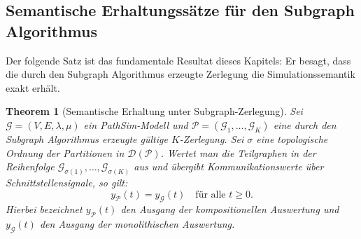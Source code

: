 ﻿\documentclass[12pt,a4paper]{article}
\newtheorem{theorem}{Theorem}[section]
\theoremstyle{definition}
\begin{document}
\subsection{Semantische Erhaltungssätze für den Subgraph Algorithmus}
\label{subsec:subgraph-sem}

Der folgende Satz ist das fundamentale Resultat dieses Kapitels:
Er besagt, dass die durch den Subgraph Algorithmus erzeugte Zerlegung
die Simulationssemantik exakt erhält.

\begin{theorem}[Semantische Erhaltung unter Subgraph-Zerlegung]
\label{thm:sempreserve}
Sei $\mathcal{G} = (V, E, \lambda, \mu)$ ein PathSim-Modell und
$\mathcal{P} = (\mathcal{G}_1, \ldots, \mathcal{G}_K)$ eine durch den
Subgraph Algorithmus erzeugte gültige $K$-Zerlegung. Sei $\sigma$ eine
topologische Ordnung der Partitionen in $\mathcal{D}(\mathcal{P})$.
Wertet man die Teilgraphen in der Reihenfolge
$\mathcal{G}_{\sigma(1)}, \ldots, \mathcal{G}_{\sigma(K)}$ aus und übergibt
Kommunikationswerte über Schnittstellensignale, so gilt:
\[
  y_{\mathcal{P}}(t) = y_{\mathcal{G}}(t) \quad \text{für alle } t \geq 0.
\]
Hierbei bezeichnet $y_{\mathcal{P}}(t)$ den Ausgang der kompositionellen
Auswertung und $y_{\mathcal{G}}(t)$ den Ausgang der monolithischen Auswertung.
\end{theorem}
\end{document}
